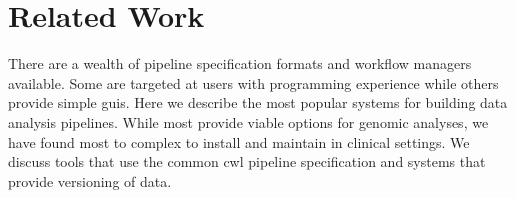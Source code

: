 

\section{Related Work} 
There are a wealth of pipeline specification formats and workflow managers
available. Some are targeted at users with programming experience while others
provide simple \glspl{gui}.  Here we describe the most popular systems for
building data analysis pipelines. While most provide viable options for genomic
analyses, we have found most to complex to install and maintain in clinical
settings. We discuss tools that use the common \gls{cwl} pipeline specification
and systems that provide versioning of data. 

